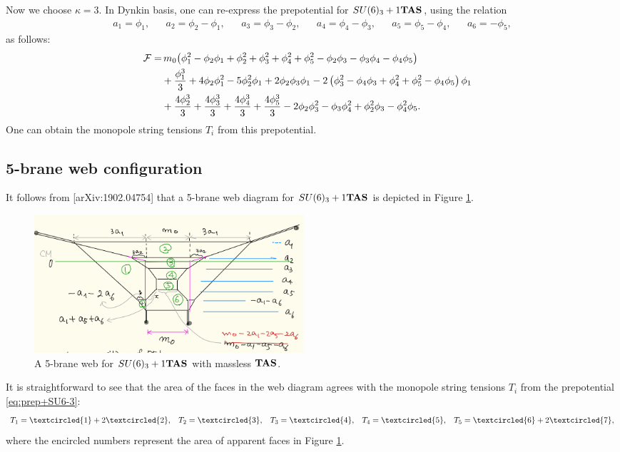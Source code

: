 \documentclass[11pt,a4paper]{article}
\begin{document}
Now we choose $\kappa=3$. In Dynkin basis, one can re-express the prepotential for $SU(6)_3+1{\bf TAS}$, using the relation
\begin{align}
	a_1= \phi_1,&& 
	a_2=\phi_2-\phi_1,&&
	a_3=\phi_3-\phi_2,&&
	a_4=\phi_4-\phi_3,&&
	a_5=\phi_5-\phi_4,&&
	a_6=-\phi_5, \label{orth2Dynkin}
\end{align}
as follows:
\begin{align}
	\mathcal{F}=&\,m_0 \big( \phi _1^2-\phi _2 \phi _1+\phi _2^2+\phi _3^2+\phi _4^2+\phi _5^2-\phi _2 \phi _3-\phi _3 \phi _4-\phi _4
   \phi _5\big) \cr
   &+ \frac{\phi _1^3}{3}+4 \phi _2 \phi _1^2-5 \phi _2^2 \phi _1+2 \phi _2 \phi _3 \phi _1-2 \left(\phi
   _3^2-\phi _4 \phi _3+\phi _4^2+\phi _5^2-\phi _4 \phi _5\right) \phi _1\cr
  & +\frac{4 \phi _2^3}{3}+\frac{4
   \phi _3^3}{3}+\frac{4 \phi _4^3}{3}+\frac{4 \phi _5^3}{3}-2 \phi _2 \phi _3^2-\phi _3 \phi _4^2+\phi
   _2^2 \phi _3-\phi _4^2 \phi _5. \label{eq:prep+SU6-3}
\end{align}
One can obtain the monopole string tensions $T_i$ from this prepotential. 
\subsection{5-brane web configuration}
It follows from [arXiv:1902.04754]  that a 5-brane web diagram for $SU(6)_3+1{\bf TAS}$ is depicted in Figure \ref{fig:SU6-monopole}.
\begin{figure}[t]
\centering
\includegraphics[width=10cm]{SU6-monopole.jpeg}
\caption{A 5-brane web for $SU(6)_3+1{\bf TAS}$ with massless ${\bf TAS}$.}
\label{fig:SU6-monopole}
\end{figure}
It is straightforward to see that the area of the faces in the web diagram agrees with the monopole string tensions $T_i$ from the prepotential \eqref{eq:prep+SU6-3}:
\begin{align}
T_1=\textcircled{\scriptsize 1} + 2\textcircled{\scriptsize 2},  %
&& T_2=\textcircled{\scriptsize 3}, %
&&T_3=\textcircled{\scriptsize 4}, %
&&T_4=\textcircled{\scriptsize 5}, %
&&T_5=\textcircled{\scriptsize 6} 
	+ 2\textcircled{\scriptsize 7},
\end{align}
where the encircled numbers represent the area of apparent faces in Figure \ref{fig:SU6-monopole}.
\end{document}

